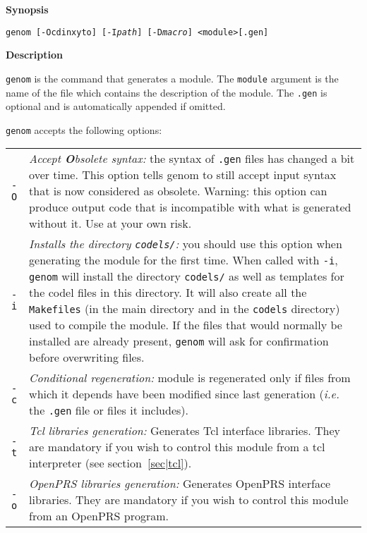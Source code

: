 \begin{description}

\item\textbf{Synopsis}

\texttt{genom [-Ocdinxyto] [-I\emph{path}] [-D\emph{macro}] <module>[.gen]}

\item\textbf{Description}

\texttt{genom}  is the  command that  generates a  module. The  \texttt{module}
argument is the name  of the file which  contains the description of  the
module. The \texttt{.gen} is   optional and  is  automatically appended  if
omitted.

\texttt{genom} accepts the following options:

\begin{tabularx}{\linewidth}{lX}
\texttt{-O} & \emph{Accept \textbf{O}bsolete syntax:} the syntax of
\texttt{.gen} files has changed a bit over time. This option tells
genom to still accept input syntax that is now considered as obsolete.
Warning: this option can produce output code that is incompatible with
what is generated without it. Use at your own risk. \\

\texttt{-i} &  \emph{Installs the  directory  \texttt{codels/}:} you should  use
this option when  generating the module  for the first time. When  called
with \texttt{-i}, \texttt{genom} will install  the directory \texttt{codels/} as
well as templates for  the codel files in this  directory.  It  will also
create  all the \texttt{Makefiles}  (in the main directory   and in the 
\texttt{codels} directory) used to compile  the module.  If  the files that would
normally be  installed  are already present, \texttt{genom}  will ask  for
confirmation before overwriting files.\\

\texttt{-c} & \emph{Conditional regeneration:} module is regenerated only
if files from which  it depends have  been modified since last generation
(\emph{i.e.} the \texttt{.gen} file or files it includes).\\

\texttt{-t} &    \emph{Tcl libraries  generation:}    Generates Tcl interface
libraries. They are mandatory  if you wish to  control this module from a
tcl interpreter (see section~\ref{sec|tcl}).\\

\texttt{-o}  & \emph{OpenPRS libraries generation:} Generates OpenPRS
interface libraries.  They are  mandatory  if you   wish to  control this
module from an OpenPRS program.\\


\end{tabularx}
\end{description}
